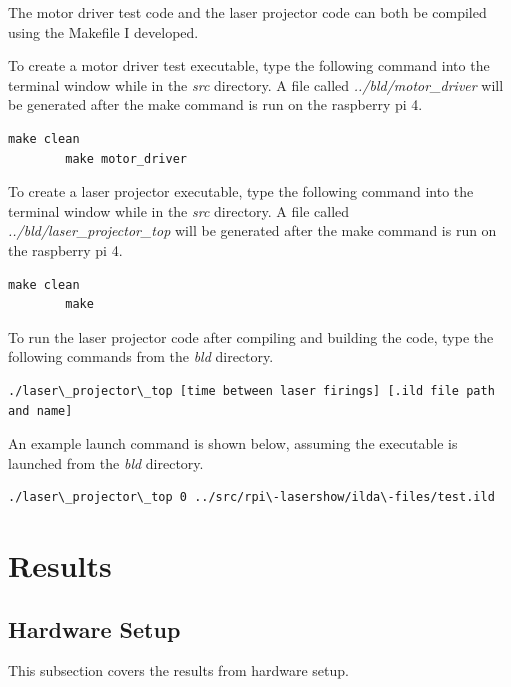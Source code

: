 \documentclass[journal]{IEEEtran}
\begin{document}
    The motor driver test code and the laser projector code can both be compiled using the Makefile I developed.

    To create a motor driver test executable, type the following command into the terminal window while in the \emph{src} directory.
    A file called \emph{../bld/motor\_driver} will be generated after the make command is run on the raspberry pi 4.

    \begin{lstlisting}[frame=single, basicstyle=\ttfamily\footnotesize, breaklines=true]
        make clean
        make motor_driver
    \end{lstlisting}

    To create a laser projector executable, type the following command into the terminal window while in the \emph{src} directory.
    A file called \emph{../bld/laser\_projector\_top} will be generated after the make command is run on the raspberry pi 4.

    \begin{lstlisting}[frame=single, basicstyle=\ttfamily\footnotesize, breaklines=true]
        make clean
        make
    \end{lstlisting}

    To run the laser projector code after compiling and building the code, type the following commands from the \emph{bld} directory.

    \begin{lstlisting}[frame=single, basicstyle=\ttfamily\footnotesize, breaklines=true]
        ./laser\_projector\_top [time between laser firings] [.ild file path and name]
    \end{lstlisting}

    An example launch command is shown below, assuming the executable is launched from the \emph{bld} directory.

    \begin{lstlisting}[frame=single, basicstyle=\ttfamily\footnotesize, breaklines=true]
        ./laser\_projector\_top 0 ../src/rpi\-lasershow/ilda\-files/test.ild
    \end{lstlisting}

    \section{Results}
    \subsection{Hardware Setup}
    This subsection covers the results from hardware setup.
\end{document}
